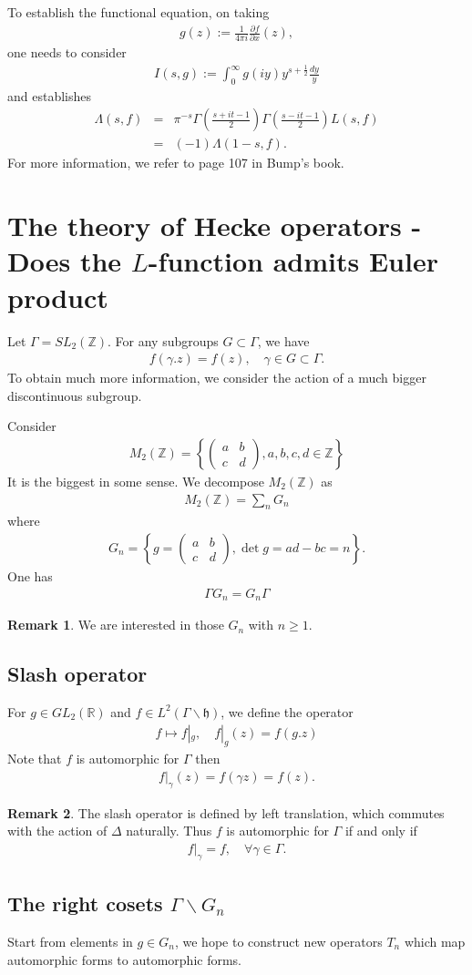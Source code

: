 \documentclass[11pt,reqno]{amsart}
\newcommand{\bna}{\begin{eqnarray*}}
\newcommand{\ena}{\end{eqnarray*}}
\newcommand{\bma}{\begin{pmatrix}}
\newcommand{\ema}{\end{pmatrix}}
\newcommand{\mk}{\mathfrak}
\def\R{\mathbb{R}}
\def\Z{\mathbb{Z}}
\theoremstyle{definition}
\newtheorem{remark}{Remark}
\begin{document}
To establish the functional equation, on taking
\bna
g(z):=\frac{1}{4\pi i}\frac{\partial f}{
\partial x}(z),
\ena
one needs to consider
\bna
I(s,g):=\int_{0}^\infty g(iy)y^{s+\frac{1}{2}}\frac{dy}{y}
\ena
and  establishes
\bna
\Lambda(s,f)&=&\pi^{-s}\Gamma\left(\frac{s+it-1}{2}\right)
\Gamma\left(\frac{s-it-1}{2}\right)L(s,f)\\
&=&(-1)\Lambda(1-s,f).
\ena
For more information, we refer to page 107 in Bump's book.

\section{The theory of Hecke operators
-Does the $L$-function admits Euler product}
Let $\Gamma=SL_2(\Z)$. For any subgroups $G\subset \Gamma$, we have
\bna
f(\gamma.z)=f(z),\quad \gamma\in G\subset\Gamma.
\ena
To obtain much more information, we consider
the action of a  much bigger discontinuous subgroup.

Consider
\bna
M_2(\Z)=\left\{\bma a&b\\c&d\ema,a,b,c,d\in \Z\right\}
\ena
It is the biggest in some sense.
We decompose $M_2(\Z)$ as
\bna
M_2(\Z)=\sum_{n}G_n
\ena
where
\bna
G_n=\left\{g=\bma a&b\\c&d\ema, \det g =ad-bc=n\right\}.
\ena
One has
\bna
\Gamma G_n=G_n\Gamma
\ena
\begin{remark}
We are interested in those $G_n$ with $n\geq 1$.
\end{remark}
\subsection{Slash operator}
For $g\in GL_2(\R)$  and $f\in L^2(\Gamma\backslash \mk h)$,
we define the operator
\bna
f\mapsto f|_{g},\quad f|_{g}(z)=f(g.z)
\ena
Note that $f$ is automorphic for $\Gamma$ then
\bna
f|_{\gamma}(z)=f(\gamma z)=f(z).
\ena

\begin{remark}
The slash operator is defined by left translation, which commutes with the
action of $\Delta$ naturally.
Thus $f$ is automorphic for $\Gamma$ if and only if
\bna
f|_{\gamma}=f,\quad \forall \gamma\in\Gamma.
\ena
\end{remark}
\subsection{The right cosets $\Gamma\backslash G_n$}
Start from elements in $g\in G_n$, we hope to construct new operators $T_n$
which map automorphic forms to automorphic forms.
\end{document}
